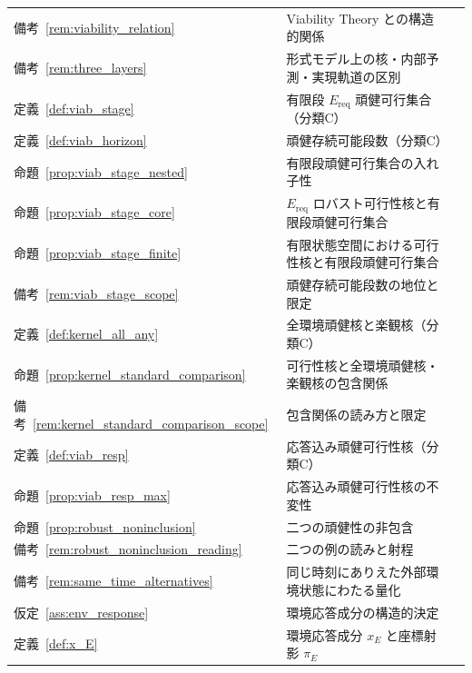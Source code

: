 \begin{longtable}{p{2.4cm} p{10.4cm} r}
備考~\ref{rem:viability_relation} & Viability Theory との構造的関係 & \pageref{rem:viability_relation} \\
備考~\ref{rem:three_layers} & 形式モデル上の核・内部予測・実現軌道の区別 & \pageref{rem:three_layers} \\
定義~\ref{def:viab_stage} & 有限段 $E_{\mathrm{req}}$ 頑健可行集合（分類C） & \pageref{def:viab_stage} \\
定義~\ref{def:viab_horizon} & 頑健存続可能段数（分類C） & \pageref{def:viab_horizon} \\
命題~\ref{prop:viab_stage_nested} & 有限段頑健可行集合の入れ子性 & \pageref{prop:viab_stage_nested} \\
命題~\ref{prop:viab_stage_core} & $E_{\mathrm{req}}$ ロバスト可行性核と有限段頑健可行集合 & \pageref{prop:viab_stage_core} \\
命題~\ref{prop:viab_stage_finite} & 有限状態空間における可行性核と有限段頑健可行集合 & \pageref{prop:viab_stage_finite} \\
備考~\ref{rem:viab_stage_scope} & 頑健存続可能段数の地位と限定 & \pageref{rem:viab_stage_scope} \\
定義~\ref{def:kernel_all_any} & 全環境頑健核と楽観核（分類C） & \pageref{def:kernel_all_any} \\
命題~\ref{prop:kernel_standard_comparison} & 可行性核と全環境頑健核・楽観核の包含関係 & \pageref{prop:kernel_standard_comparison} \\
備考~\ref{rem:kernel_standard_comparison_scope} & 包含関係の読み方と限定 & \pageref{rem:kernel_standard_comparison_scope} \\
定義~\ref{def:viab_resp} & 応答込み頑健可行性核（分類C） & \pageref{def:viab_resp} \\
命題~\ref{prop:viab_resp_max} & 応答込み頑健可行性核の不変性 & \pageref{prop:viab_resp_max} \\
命題~\ref{prop:robust_noninclusion} & 二つの頑健性の非包含 & \pageref{prop:robust_noninclusion} \\
備考~\ref{rem:robust_noninclusion_reading} & 二つの例の読みと射程 & \pageref{rem:robust_noninclusion_reading} \\
備考~\ref{rem:same_time_alternatives} & 同じ時刻にありえた外部環境状態にわたる量化 & \pageref{rem:same_time_alternatives} \\
仮定~\ref{ass:env_response} & 環境応答成分の構造的決定 & \pageref{ass:env_response} \\
定義~\ref{def:x_E} & 環境応答成分 $x_E$ と座標射影 $\pi_E$ & \pageref{def:x_E} \\

\end{longtable}

